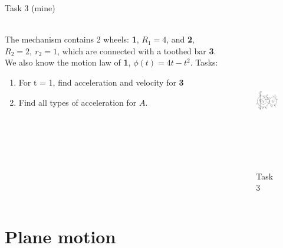 \documentclass[aspectratio=169,xcolor=table,10pt, notes=hide]{beamer}
\begin{document}
\begin{frame}[t]{Task 3 (mine)}
    \framesubtitle{}
    \begin{columns}[c,onlytextwidth]
        \begin{column}{0.59\textwidth}
            The mechanism contains 2 wheels: \textbf{1}, $R_1 = 4$, and \textbf{2}, $R_2=2,\ r_2 = 1$, which are connected with a toothed bar \textbf{3}. We also know the motion law of \textbf{1}, $\phi(t) = 4t-t^2$.
            \medskip
            Tasks:
            \begin{enumerate}
                \item For t = 1, find acceleration and velocity for \textbf{3}
                \item Find all types of acceleration for $A$.
            \end{enumerate}
        \end{column}
        \begin{column}{0.39\textwidth}
            \begin{figure}[H]
                \centering\includegraphics[height=6cm,width=1\textwidth,keepaspectratio]{image14.png}
                \caption*{Task 3}
                \label{fig:image14.png}
            \end{figure}
        \end{column}
    \end{columns}
\end{frame}

\section*{Plane motion}
\end{document}
